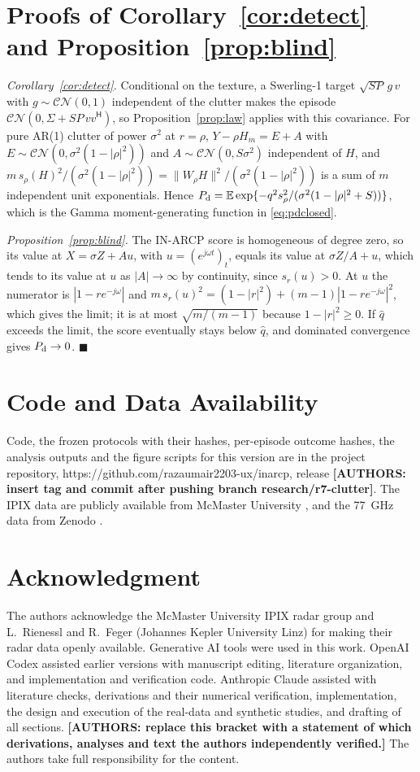 \documentclass[journal]{IEEEtran}
\begin{document}
\section{Proofs of Corollary~\ref{cor:detect} and Proposition~\ref{prop:blind}}\label{app:detect}
\emph{Corollary~\ref{cor:detect}.} Conditional on the texture, a Swerling-1 target $\sqrt{SP}\,g\,v$ with $g\sim\mathcal{CN}(0,1)$ independent of the clutter makes the episode $\mathcal{CN}(0,\Sigma+SP\,vv^{\mathsf H})$, so Proposition~\ref{prop:law} applies with this covariance. For pure AR(1) clutter of power $\sigma^2$ at $r=\rho$, $Y-\rho H_m=E+A$ with $E\sim\mathcal{CN}(0,\sigma^2(1-|\rho|^2))$ and $A\sim\mathcal{CN}(0,S\sigma^2)$ independent of $H$, and $m\,s_\rho(H)^2/(\sigma^2(1-|\rho|^2))=\|W_\rho H\|^2/(\sigma^2(1-|\rho|^2))$ is a sum of $m$ independent unit exponentials. Hence $P_{\rm d}=\mathbb E\exp\{-q^2s_\rho^2/(\sigma^2(1-|\rho|^2+S))\}$, which is the Gamma moment-generating function in \eqref{eq:pdclosed}.

\emph{Proposition~\ref{prop:blind}.} The IN-ARCP score is homogeneous of degree zero, so its value at $X=\sigma Z+Au$, with $u=(e^{j\omega t})_t$, equals its value at $\sigma Z/A+u$, which tends to its value at $u$ as $|A|\to\infty$ by continuity, since $s_r(u)>0$. At $u$ the numerator is $|1-re^{-j\omega}|$ and $m\,s_r(u)^2=(1-|r|^2)+(m-1)|1-re^{-j\omega}|^2$, which gives the limit; it is at most $\sqrt{m/(m-1)}$ because $1-|r|^2\ge0$. If $\widehat q$ exceeds the limit, the score eventually stays below $\widehat q$, and dominated convergence gives $P_{\rm d}\to0$. \hfill$\blacksquare$

\section*{Code and Data Availability}
Code, the frozen protocols with their hashes, per-episode outcome hashes, the analysis outputs and the figure scripts for this version are in the project repository, https://github.com/razaumair2203-ux/inarcp, release \textbf{[AUTHORS: insert tag and commit after pushing branch research/r7-clutter]}. The IPIX data are publicly available from McMaster University \cite{ipixweb}, and the 77~GHz data from Zenodo \cite{jku2026}.

\section*{Acknowledgment}
The authors acknowledge the McMaster University IPIX radar group and L.~Rienessl and R.~Feger (Johannes Kepler University Linz) for making their radar data openly available. Generative AI tools were used in this work. OpenAI Codex assisted earlier versions with manuscript editing, literature organization, and implementation and verification code. Anthropic Claude assisted with literature checks, derivations and their numerical verification, implementation, the design and execution of the real-data and synthetic studies, and drafting of all sections. \textbf{[AUTHORS: replace this bracket with a statement of which derivations, analyses and text the authors independently verified.]} The authors take full responsibility for the content.



\end{document}

